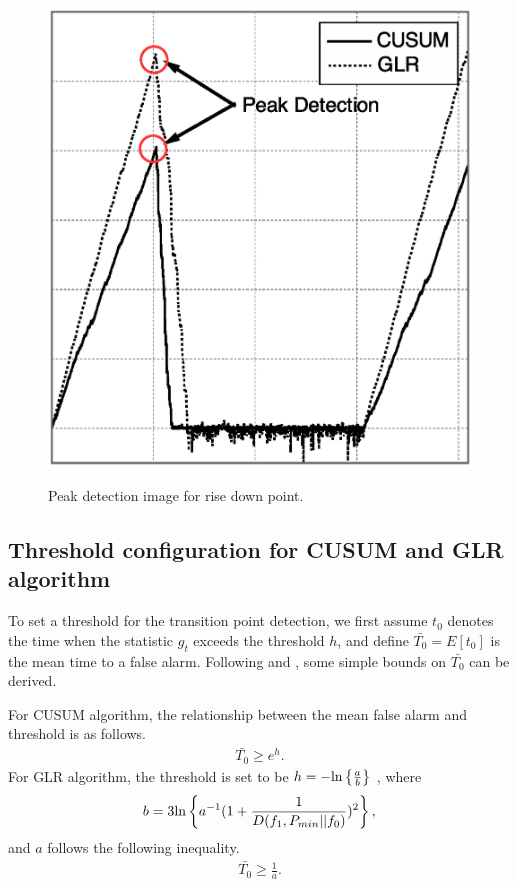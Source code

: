 \begin{center}
  \begin{figure}[t]
    \centering
    \includegraphics[width=120mm]{peak_ON2OFF.eps}
    \label{peak_ON2OFF}
    \caption{Peak detection image for rise down point.}
  \end{figure}
\end{center} 


\subsection{Threshold configuration for CUSUM and GLR algorithm}
To set a threshold for the transition point detection, we first assume $t_0$ denotes the time when the statistic $g_t$ exceeds the threshold $h$, and define $\bar{T_0}=E[t_0]$ is the mean time to a false alarm. Following \cite{ref:threshold_cusum} and \cite{ref:threshold_GLR}, some simple bounds on $\bar{T_0}$ can be derived.

For CUSUM algorithm, the relationship between the mean false alarm and threshold is as follows.
\begin{eqnarray}
\bar{T_0} \geq e^h.
\end{eqnarray}
For GLR algorithm, the threshold is set to be $h=-{\rm ln}\left\{\frac{a}{b}\right\}$ , where 
\begin{eqnarray}
b=3{\rm ln}\left\{a^{-1}(1+\frac{1}{D(f_1,P_{min}||f_0)})^2\right\},
\end{eqnarray}
and $a$ follows the following inequality.
\begin{eqnarray}
\bar{T_0} \geq \frac{1}{a}.
\end{eqnarray}

